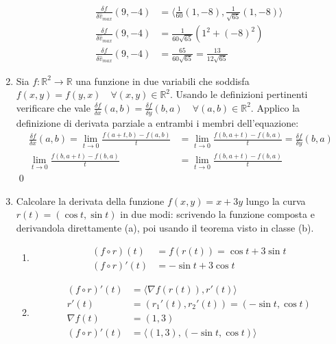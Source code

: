 \documentclass{article}
\begin{document}
\begin{enumerate}
\begin{enumerate}
        \begin{align*}
          \frac{\delta f}{\delta \hat v_{max}} (9, -4) &= \langle \frac{1}{60} (1, -8), \frac{1}{\sqrt{65}} (1, -8) \rangle \\
          \frac{\delta f}{\delta \hat v_{max}} (9, -4) &= \frac{1}{60 \sqrt{65}} (1^2 + (-8)^2) \\
          \frac{\delta f}{\delta \hat v_{max}} (9, -4) &= \frac{65}{60 \sqrt{65}} = \frac{13}{12\sqrt{65}}
        \end{align*}
    \end{enumerate}
  \item Sia $f: \mathbb{R}^2 \to \mathbb{R}$ una funzione in due variabili che
    soddisfa $f(x,y) = f(y,x) \quad \forall (x,y) \in \mathbb{R}^2$. Usando le definizioni
    pertinenti verificare che vale $\frac{\delta f}{\delta x}(a,b) =
    \frac{\delta f}{\delta y}(b,a) \quad \forall (a,b) \in \mathbb{R}^2$. Applico
    la definizione di derivata parziale a entrambi i membri dell'equazione:
    \begin{align*}
      \frac{\delta f}{\delta x}(a,b) = \lim_{t \to 0} \frac{f(a + t, b) - f(a,b)}{t} &=
      \lim_{t \to 0}\frac{f(b, a+t) - f(b,a)}{t} = \frac{\delta f}{\delta y}(b,a) \\
      \lim_{t \to 0} \frac{f(b, a+t) - f(b,a)}{t} &= \lim_{t \to 0}\frac{f(b, a+t) - f(b,a)}{t}
    \end{align*}
    \qed
  \item Calcolare la derivata della funzione $f(x,y) = x + 3y$ lungo la curva
    $r(t) = (\cos t, \sin t)$ in due modi: scrivendo la funzione composta
    e derivandola direttamente (a), poi usando il teorema visto in classe (b).
    \begin{enumerate}
      \item
        \begin{align*}
          (f \circ r)(t) &= f(r(t)) = \cos t + 3\sin t \\
          (f \circ r)'(t) &= -\sin t + 3\cos t
        \end{align*}
      \item
        \begin{align*}
          (f \circ r)'(t) &= \langle \nabla f(r(t)), r'(t) \rangle \\
          r'(t) &= (r_1'(t), r_2'(t)) = (-\sin t, \cos t) \\
          \nabla f(t) &= (1, 3) \\
          (f \circ r)'(t) &= \langle (1, 3), (-\sin t, \cos t) \rangle \\

\end{align*}
\end{enumerate}
\end{enumerate}
\end{document}
